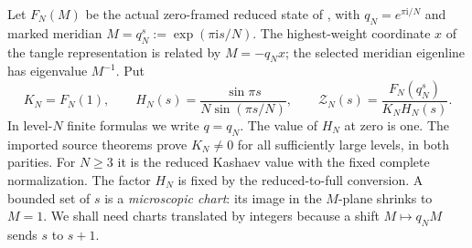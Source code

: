 \documentclass[11pt]{article}
\numberwithin{equation}{section}
\theoremstyle{definition}\newtheorem{definition}[theorem]{Definition}
\newcommand{\ii}{\mathrm i}
\newcommand{\Z}{\mathcal Z}
\begin{document}
Let $F_N(M)$ be the actual zero-framed reduced state of
\cite{Meridian}, with $q_N=e^{\pi\ii/N}$ and marked meridian
$M=q_N^s:=\exp(\pi\ii s/N)$. The highest-weight coordinate $x$ of the tangle representation
is related by $M=-q_Nx$; the selected meridian eigenline has
eigenvalue $M^{-1}$. Put
\begin{equation}\label{me:normalization}
 K_N=F_N(1),\qquad H_N(s)=\frac{\sin\pi s}{N\sin(\pi s/N)},
 \qquad \Z_N(s)=\frac{F_N(q_N^s)}{K_NH_N(s)}.
\end{equation}
In level-$N$ finite formulas we write $q=q_N$.
The value of $H_N$ at zero is one. The imported source theorems
prove $K_N\ne0$ for all sufficiently large levels, in both parities.
For $N\ge3$ it is the reduced Kashaev value with the fixed complete
normalization. The factor $H_N$ is fixed by the reduced-to-full conversion.
A bounded set of $s$ is a \emph{microscopic chart}: its image in the
$M$-plane shrinks to $M=1$. We shall need charts translated by integers
because a shift $M\mapsto q_NM$ sends $s$ to $s+1$.
\end{document}
